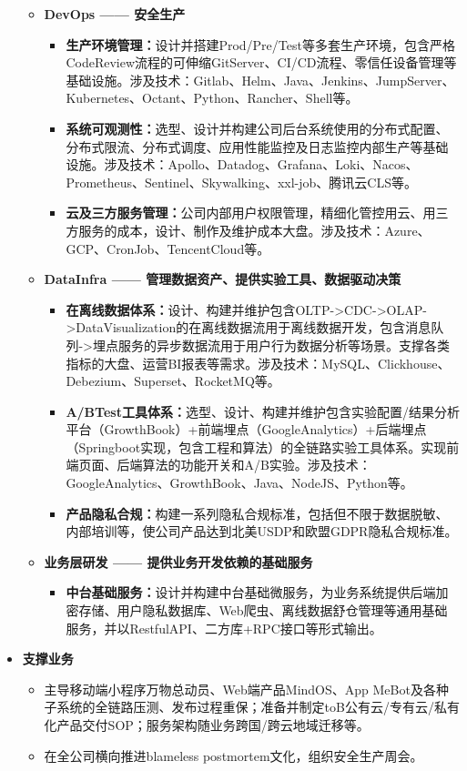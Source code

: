 \documentclass[letterpaper,11pt]{article}
\begin{document}
\begin{spacing}{0.9}
\begin{itemize}
\begin{itemize}
				\item \textbf{DevOps —— 安全生产}
				\begin{itemize}
					\item \textbf{生产环境管理：}设计并搭建Prod/Pre/Test等多套生产环境，包含严格CodeReview流程的可伸缩GitServer、CI/CD流程、零信任设备管理等基础设施。涉及技术：Gitlab、Helm、Java、Jenkins、JumpServer、Kubernetes、Octant、Python、Rancher、Shell等。
					\item \textbf{系统可观测性：}选型、设计并构建公司后台系统使用的分布式配置、分布式限流、分布式调度、应用性能监控及日志监控内部生产等基础设施。涉及技术：Apollo、Datadog、Grafana、Loki、Nacos、Prometheus、Sentinel、Skywalking、xxl-job、腾讯云CLS等。
					\item \textbf{云及三方服务管理：}公司内部用户权限管理，精细化管控用云、用三方服务的成本，设计、制作及维护成本大盘。涉及技术：Azure、GCP、CronJob、TencentCloud等。
				\end{itemize}
				
				\item \textbf{DataInfra —— 管理数据资产、提供实验工具、数据驱动决策}
				\begin{itemize}
					\item     \textbf{在离线数据体系：}设计、构建并维护包含OLTP->CDC->OLAP->DataVisualization的在离线数据流用于离线数据开发，包含消息队列->埋点服务的异步数据流用于用户行为数据分析等场景。支撑各类指标的大盘、运营BI报表等需求。涉及技术：MySQL、Clickhouse、Debezium、Superset、RocketMQ等。
					\item
					\textbf{A/BTest工具体系：}选型、设计、构建并维护包含实验配置/结果分析平台（GrowthBook）+前端埋点（GoogleAnalytics）+后端埋点（Springboot实现，包含工程和算法）的全链路实验工具体系。实现前端页面、后端算法的功能开关和A/B实验。涉及技术：GoogleAnalytics、GrowthBook、Java、NodeJS、Python等。
					\item
					\textbf{产品隐私合规：}构建一系列隐私合规标准，包括但不限于数据脱敏、内部培训等，使公司产品达到北美USDP和欧盟GDPR隐私合规标准。
				\end{itemize}
				
				\item \textbf{业务层研发 —— 提供业务开发依赖的基础服务}
				\begin{itemize}
					\item \textbf{中台基础服务：}设计并构建中台基础微服务，为业务系统提供后端加密存储、用户隐私数据库、Web爬虫、离线数据舒仓管理等通用基础服务，并以RestfulAPI、二方库+RPC接口等形式输出。
				\end{itemize}
			\end{itemize}
			\item \textbf{支撑业务}
			\begin{itemize}
				\item 主导移动端小程序万物总动员、Web端产品MindOS、App MeBot及各种子系统的全链路压测、发布过程重保；准备并制定toB公有云/专有云/私有化产品交付SOP；服务架构随业务跨国/跨云地域迁移等。
				\item 在全公司横向推进blameless postmortem文化，组织安全生产周会。
			\end{itemize}
		\end{itemize}
		

\end{spacing}
\end{document}
